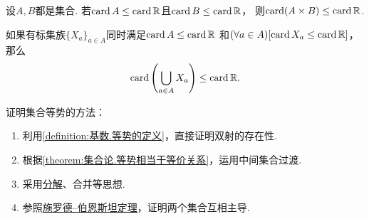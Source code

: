 \begin{proposition}
设\(A,B\)都是集合.
若\(\operatorname{card} A \leq \operatorname{card}\mathbb{R}\)且\(\operatorname{card} B \leq \operatorname{card}\mathbb{R}\)，
则\(\operatorname{card}(A \times B) \leq \operatorname{card}\mathbb{R}\).
\end{proposition}

\begin{proposition}
如果有标集族\(\{X_a\}_{a \in A}\)同时满足\(
	\operatorname{card} A \leq \operatorname{card}\mathbb{R}
\)
和\(
	(\forall a \in A)
	[\operatorname{card} X_a \leq \operatorname{card}\mathbb{R}]
\)，
那么\begin{equation*}
	\operatorname{card}\left( \bigcup_{a \in A} X_a \right) \leq \operatorname{card}\mathbb{R}.
\end{equation*}
\end{proposition}

证明集合等势的方法：\begin{enumerate}
	\item 利用\cref{definition:基数.等势的定义}，直接证明双射的存在性.
	\item 根据\cref{theorem:集合论.等势相当于等价关系}，运用中间集合过渡.
	\item 采用\hyperref[theorem:基数.集合在映射下的分解]{分解}、合并等思想.
	\item 参照\hyperref[theorem:集合论.施罗德--伯恩斯坦定理]{施罗德--伯恩斯坦定理}，证明两个集合互相主导.
\end{enumerate}
